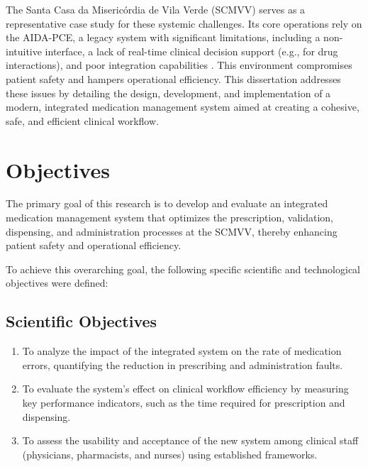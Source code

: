 The Santa Casa da Misericórdia de Vila Verde (SCMVV) serves as a representative case study for these systemic challenges. Its core operations rely on the AIDA-PCE, a legacy system with significant limitations, including a non-intuitive interface, a lack of real-time clinical decision support (e.g., for drug interactions), and poor integration capabilities \cite{moss2015, bowles2020}. This environment compromises patient safety and hampers operational efficiency. This dissertation addresses these issues by detailing the design, development, and implementation of a modern, integrated medication management system aimed at creating a cohesive, safe, and efficient clinical workflow.

\section{Objectives}

The primary goal of this research is to develop and evaluate an integrated medication management system that optimizes the prescription, validation, dispensing, and administration processes at the SCMVV, thereby enhancing patient safety and operational efficiency.

To achieve this overarching goal, the following specific scientific and technological objectives were defined:

\subsection{Scientific Objectives}
\begin{enumerate}
    \item To analyze the impact of the integrated system on the rate of medication errors, quantifying the reduction in prescribing and administration faults.
    \item To evaluate the system's effect on clinical workflow efficiency by measuring key performance indicators, such as the time required for prescription and dispensing.
    \item To assess the usability and acceptance of the new system among clinical staff (physicians, pharmacists, and nurses) using established frameworks.
\end{enumerate}


